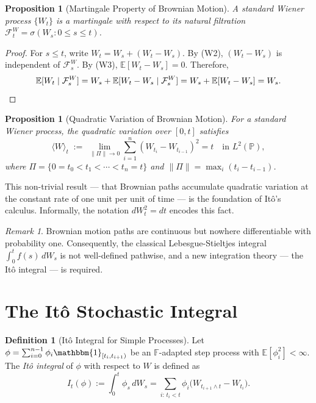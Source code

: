 \documentclass[12pt, a4paper, oneside]{report}
\theoremstyle{plain}
\newtheorem{proposition}[theorem]{Proposition}
\theoremstyle{definition}
\newtheorem{definition}[theorem]{Definition}
\theoremstyle{remark}
\newtheorem{remark}[theorem]{Remark}
\newcommand{\Prob}{\mathbb{P}}
\newcommand{\E}{\mathbb{E}}
\newcommand{\F}{\mathcal{F}}
\begin{document}
\begin{proposition}[Martingale Property of Brownian Motion]
\label{prop:bm_martingale}
A standard Wiener process $\{W_t\}$ is a martingale with respect to its natural
filtration $\F_t^W = \sigma(W_s : 0 \leq s \leq t)$.
\end{proposition}

\begin{proof}
For $s \leq t$, write $W_t = W_s + (W_t - W_s)$.  By (W2), $(W_t - W_s)$ is
independent of $\F_s^W$.  By (W3), $\E[W_t - W_s] = 0$.  Therefore,
\[
  \E[W_t \mid \F_s^W] = W_s + \E[W_t - W_s \mid \F_s^W]
  = W_s + \E[W_t - W_s] = W_s. \qedhere
\]
\end{proof}

\begin{proposition}[Quadratic Variation of Brownian Motion]
\label{prop:bm_qv}
For a standard Wiener process, the quadratic variation over $[0,t]$ satisfies
\[
  \langle W \rangle_t \;:=\; \lim_{\|\Pi\| \to 0}
    \sum_{i=1}^{n} (W_{t_i} - W_{t_{i-1}})^2 = t
    \quad \text{in } L^2(\Prob),
\]
where $\Pi = \{0 = t_0 < t_1 < \cdots < t_n = t\}$ and
$\|\Pi\| = \max_i (t_i - t_{i-1})$.
\end{proposition}

This non-trivial result --- that Brownian paths accumulate quadratic variation at
the constant rate of one unit per unit of time --- is the foundation of It\^{o}'s
calculus.  Informally, the notation $dW_t^2 = dt$ encodes this fact.

\begin{remark}
Brownian motion paths are continuous but nowhere differentiable with probability
one.  Consequently, the classical Lebesgue-Stieltjes integral $\int_0^t f(s)\,dW_s$
is not well-defined pathwise, and a new integration theory --- the It\^{o} integral ---
is required.
\end{remark}

\section{The It\^{o} Stochastic Integral}

\begin{definition}[It\^{o} Integral for Simple Processes]
Let $\phi = \sum_{i=0}^{n-1} \phi_i \mathbbm{1}_{[t_i, t_{i+1})}$ be an
$\mathbb{F}$-adapted step process with $\E[\phi_i^2] < \infty$.  The
\emph{It\^{o} integral} of $\phi$ with respect to $W$ is defined as
\[
  I_t(\phi) := \int_0^t \phi_s \,dW_s
  = \sum_{i:\, t_i < t} \phi_i \bigl(W_{t_{i+1} \wedge t} - W_{t_i}\bigr).
\]
\end{definition}
\end{document}
